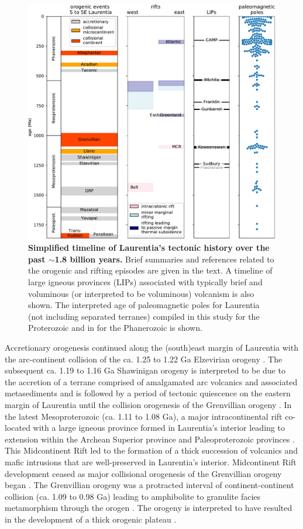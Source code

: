 \documentclass[11pt,letterpaper]{article}
\begin{document}
\begin{figure}
\centering
\includegraphics[width=\textwidth]{../Figures/Tectonic_history.pdf}
\caption{\small{\textbf{Simplified timeline of Laurentia's tectonic history over the past $\sim$1.8 billion years.} Brief summaries and references related to the orogenic and rifting episodes are given in the text. A timeline of large igneous provinces  (LIPs) associated with typically brief and voluminous (or interpreted to be voluminous) volcanism is also shown. The interpreted age of paleomagnetic poles for Laurentia (not including separated terranes) compiled in this study for the Proterozoic and in \cite{Torsvik2012a} for the Phanerozoic is shown.}}
\label{fig:tectonic_history}
\end{figure}

Accretionary orogenesis continued along the (south)east margin of Laurentia with the arc-continent collision of the ca. 1.25 to 1.22 Ga Elzevirian orogeny \citep{McLelland2013a}. The subsequent ca. 1.19 to 1.16 Ga Shawinigan orogeny is interpreted to be due to the accretion of a terrane comprised of amalgamated arc volcanics and associated metasediments and is followed by a period of tectonic quiescence on the eastern margin of Laurentia until the collision orogenesis of the Grenvillian orogeny \citep{McLelland2010a}. In the latest Mesoproterozoic (ca. 1.11 to 1.08 Ga), a major intracontinental rift co-located with a large igneous province formed in Laurentia's interior leading to extension within the Archean Superior province and Paleoproterozoic provinces \citep{Cannon1992b}. This Midcontinent Rift led to the formation of a thick succession of volcanics and mafic intrusions that are well-preserved in Laurentia's interior.  Midcontinent Rift development ceased as major collisional orogenesis of the Grenvillian orogeny began \citep{Swanson-Hysell2019a}. The Grenvillian orogeny was a protracted interval of continent-continent collision (ca. 1.09 to 0.98 Ga) leading to amphibolite to granulite facies metamorphism through the orogen \citep{McLelland2010a}. The orogeny is interpreted to have resulted in the development of a thick orogenic plateau \citep{Rivers2008a}.
\end{document}
